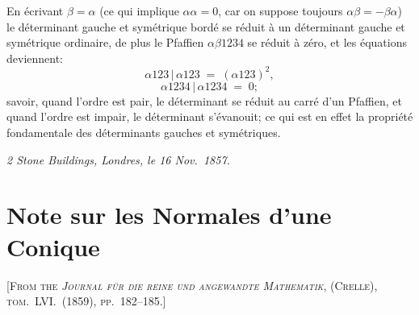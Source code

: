 \documentclass[11pt,a4paper]{article}
\begin{document}
En \'ecrivant $\beta = \alpha$ (ce qui implique $\alpha\alpha = 0$, car on suppose
toujours $\alpha\beta = -\beta\alpha$) le d\'eterminant gauche et sym\'etrique
bord\'e se r\'eduit \`a un d\'eterminant gauche et sym\'etrique ordinaire, de plus
le Pfaffien $\alpha\beta1234$ se r\'eduit \`a z\'ero, et les \'equations
deviennent:
\[
\alpha123\,|\,\alpha123 \;=\; (\alpha123)^{2},
\]
\[
\alpha1234\,|\,\alpha1234 \;=\; 0;
\]
savoir, quand l'ordre est pair, le d\'eterminant se r\'eduit au carr\'e d'un
Pfaffien, et quand l'ordre est impair, le d\'eterminant s'\'evanouit; ce qui est
en effet la propri\'et\'e fondamentale des d\'eterminants gauches et
sym\'etriques.

\medskip
\noindent\textit{2 Stone Buildings, Londres, le 16 Nov.\ 1857.}

\newpage


\setcounter{page}{74}

\section*{Note sur les Normales d'une Conique}
\label{paper:238}

\textsc{[From the \textit{Journal f\"ur die reine und angewandte Mathematik}, (Crelle), tom.~LVI.\ (1859), pp.~182--185.]}

\medskip
\end{document}
